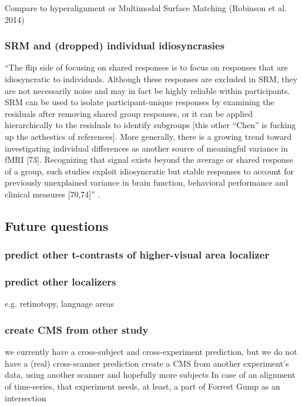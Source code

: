 Compare to hyperalignment or Multimodal Surface Matching (Robinson et al. 2014)


\subsubsection{SRM and (dropped) individual idiosyncrasies}

``The flip side of focusing on shared responses is to focus on responses that
are idiosyncratic to individuals.
%
Although these responses are excluded in SRM, they are not necessarily noise and
may in fact be highly reliable within participants.
%
SRM can be used to isolate participant-unique responses by examining the
residuals after removing shared group responses, or it can be applied
hierarchically to the residuals to identify subgroups \citep{chen2017shared}
\citep{cohen2017computational} [this other ``Chen'' is fucking up the aethestics
of references].
%
More generally, there is a growing trend toward investigating individual
differences as another source of meaningful variance in fMRI [73].
%
Recognizing that signal exists beyond the average or shared response of a group,
such studies exploit idiosyncratic but stable responses to account for
previously unexplained variance in brain function, behavioral performance and
clinical measures [70,74]'' \citep{cohen2017computational}.





\subsection{Future questions}


\subsubsection{predict other t-contrasts of higher-visual area localizer}

\subsubsection{predict other localizers}
%
e.g. retinotopy, language areas


\subsubsection{create CMS from other study}
%
we currently have a cross-subject and cross-experiment prediction,
but we do not have a (real) cross-scanner prediction
%
create a CMS from another experiment’s data,
using another scanner and hopefully more subjects
%
In case of an alignment of time-series,
that experiment needs, at least, a part of Forrest Gump as an intersection


